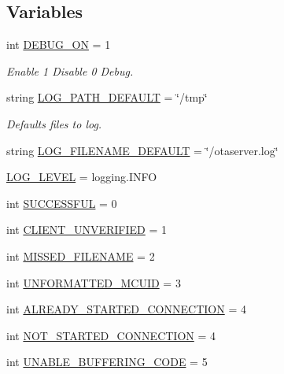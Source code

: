 \subsection*{Variables}
\begin{DoxyCompactItemize}
\item 
int \hyperlink{namespaceserver_a3ae1ac2f6b7f0e83705066a294c6af9b}{D\+E\+B\+U\+G\+\_\+\+ON} = 1
\begin{DoxyCompactList}\small\item\em Enable 1 Disable 0 Debug. \end{DoxyCompactList}\item 
string \hyperlink{namespaceserver_a6e3160a2459a5f5c0b05d31bea269c07}{L\+O\+G\+\_\+\+P\+A\+T\+H\+\_\+\+D\+E\+F\+A\+U\+LT} = \char`\"{}/tmp\char`\"{}
\begin{DoxyCompactList}\small\item\em Defaults files to log. \end{DoxyCompactList}\item 
string \hyperlink{namespaceserver_ae9611c1fa51131280e6b7c2e7ea199af}{L\+O\+G\+\_\+\+F\+I\+L\+E\+N\+A\+M\+E\+\_\+\+D\+E\+F\+A\+U\+LT} = \char`\"{}/otaserver.\+log\char`\"{}
\item 
\hyperlink{namespaceserver_a623756b923995322c8ea575f3b9e70ba}{L\+O\+G\+\_\+\+L\+E\+V\+EL} = logging.\+I\+N\+FO
\item 
int \hyperlink{namespaceserver_ac636d4745eb8df94294d20a79e9736c2}{S\+U\+C\+C\+E\+S\+S\+F\+UL} = 0
\item 
int \hyperlink{namespaceserver_aa1f32b90430e9bda83de3d5e601402d5}{C\+L\+I\+E\+N\+T\+\_\+\+U\+N\+V\+E\+R\+I\+F\+I\+ED} = 1
\item 
int \hyperlink{namespaceserver_abd54d09502b28ddf1b7c67d7128f0770}{M\+I\+S\+S\+E\+D\+\_\+\+F\+I\+L\+E\+N\+A\+ME} = 2
\item 
int \hyperlink{namespaceserver_ae93172172b034664ce8a47255943b867}{U\+N\+F\+O\+R\+M\+A\+T\+T\+E\+D\+\_\+\+M\+C\+U\+ID} = 3
\item 
int \hyperlink{namespaceserver_a02bffbe3ff309c8cca6cfdc9fe84b335}{A\+L\+R\+E\+A\+D\+Y\+\_\+\+S\+T\+A\+R\+T\+E\+D\+\_\+\+C\+O\+N\+N\+E\+C\+T\+I\+ON} = 4
\item 
int \hyperlink{namespaceserver_ac3607b92a19b8b6e55eec69cd0e45e6d}{N\+O\+T\+\_\+\+S\+T\+A\+R\+T\+E\+D\+\_\+\+C\+O\+N\+N\+E\+C\+T\+I\+ON} = 4
\item 
int \hyperlink{namespaceserver_a6d2a5626a7ca491da6005e14db1de116}{U\+N\+A\+B\+L\+E\+\_\+\+B\+U\+F\+F\+E\+R\+I\+N\+G\+\_\+\+C\+O\+DE} = 5
\item 

\end{DoxyCompactItemize}
